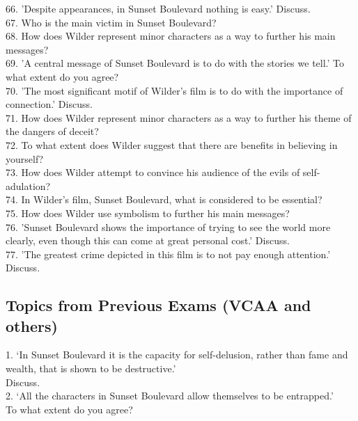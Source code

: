 \documentclass[a4paper]{article}
\begin{document}
66. 'Despite appearances, in Sunset Boulevard nothing is easy.' Discuss.\\

67. Who is the main victim in Sunset Boulevard?\\

68. How does Wilder represent minor characters as a way to further his main messages?\\

69. 'A central message of Sunset Boulevard is to do with the stories we tell.' To what extent do you agree?\\

70. 'The most significant motif of Wilder's film is to do with the importance of connection.' Discuss.\\

71. How does Wilder represent minor characters as a way to further his theme of the dangers of deceit?\\

72. To what extent does Wilder suggest that there are benefits in believing in yourself?\\

73. How does Wilder attempt to convince his audience of the evils of self-adulation?\\

74. In Wilder's film, Sunset Boulevard, what is considered to be essential?\\

75. How does Wilder use symbolism to further his main messages?\\

76. 'Sunset Boulevard shows the importance of trying to see the world more clearly, even though this can come at great personal cost.' Discuss.\\

77. 'The greatest crime depicted in this film is to not pay enough attention.' Discuss.\\


\subsection{Topics from Previous Exams (VCAA and others)}
1. ‘In Sunset Boulevard it is the capacity for self-delusion, rather than fame and wealth, that is shown to be destructive.’\\ Discuss.\\

2. ‘All the characters in Sunset Boulevard allow themselves to be entrapped.’\\ To what extent do you agree?\\
\end{document}
